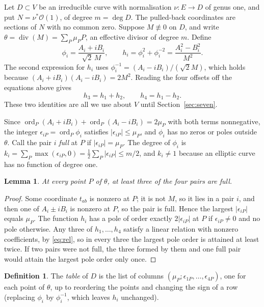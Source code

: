 \documentclass[11pt]{amsart}
\newtheorem{lemma}[theorem]{Lemma}
\theoremstyle{definition}
\newtheorem{definition}[theorem]{Definition}
\newcommand{\Div}{\operatorname{div}}
\newcommand{\ord}{\operatorname{ord}}
\begin{document}
Let $D\subset V$ be an irreducible curve with normalisation $\nu\colon E\to D$ of genus one, and put
$N=\nu^*\mathcal O(1)$, of degree $m=\deg D$. The pulled-back coordinates are sections of $N$ with no common zero.
Suppose $M\not\equiv0$ on $D$, and write $\theta=\Div(M)=\sum_P\mu_PP$, an effective divisor of degree $m$. Define
\[
\phi_i=\frac{A_i+iB_i}{\sqrt2\,M},\qquad h_i=\phi_i^2+\phi_i^{-2}=\frac{A_i^2-B_i^2}{M^2}.
\]
The second expression for $h_i$ uses $\phi_i^{-1}=(A_i-iB_i)/(\sqrt2M)$, which holds because
$(A_i+iB_i)(A_i-iB_i)=2M^2$. Reading the four offsets off the equations above gives
\begin{equation}\label{eq:rel}
h_3=h_1+h_2,\qquad h_4=h_1-h_2.
\end{equation}
These two identities are all we use about $V$ until Section~\ref{sec:seven}.

Since $\ord_P(A_i+iB_i)+\ord_P(A_i-iB_i)=2\mu_P$ with both terms nonnegative, the integer
$\epsilon_{iP}=\ord_P\phi_i$ satisfies $|\epsilon_{iP}|\le\mu_P$, and $\phi_i$ has no zeros or poles outside
$\theta$. Call the pair $i$ \emph{full} at $P$ if $|\epsilon_{iP}|=\mu_P$. The degree of $\phi_i$ is
$k_i=\sum_P\max(\epsilon_{iP},0)=\tfrac12\sum_P|\epsilon_{iP}|\le m/2$, and $k_i\ne1$ because an elliptic curve has
no function of degree one.

\begin{lemma}\label{lem:full}
At every point $P$ of $\theta$, at least three of the four pairs are full.
\end{lemma}

\begin{proof}
Some coordinate $t_{ab}$ is nonzero at $P$; it is not $M$, so it lies in a pair $i$, and then one of $A_i\pm iB_i$
is nonzero at $P$, so the pair is full. Hence the largest $|\epsilon_{iP}|$ equals $\mu_P$. The function $h_i$ has a
pole of order exactly $2|\epsilon_{iP}|$ at $P$ if $\epsilon_{iP}\ne0$ and no pole otherwise. Any three of
$h_1,\dots,h_4$ satisfy a linear relation with nonzero coefficients, by \eqref{eq:rel}, so in every three the
largest pole order is attained at least twice. If two pairs were not full, the three formed by them and one full pair
would attain the largest pole order only once.
\end{proof}

\begin{definition}
The \emph{table} of $D$ is the list of columns $(\mu_P;\epsilon_{1P},\dots,\epsilon_{4P})$, one for each point of
$\theta$, up to reordering the points and changing the sign of a row (replacing $\phi_i$ by $\phi_i^{-1}$, which leaves
$h_i$ unchanged).
\end{definition}
\end{document}
